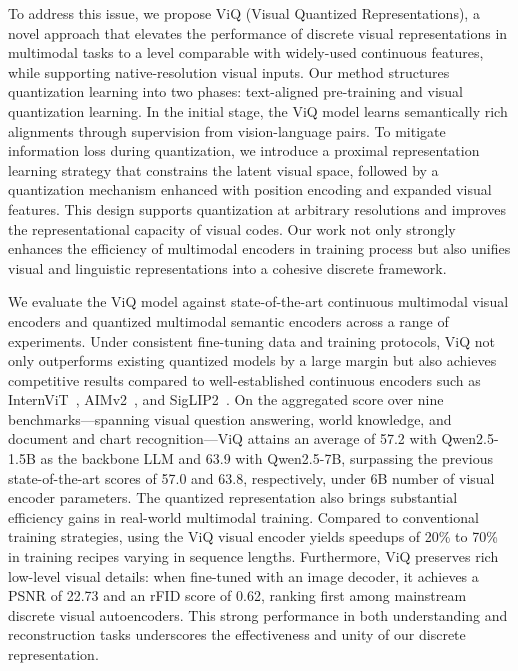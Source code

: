 To address this issue, we propose ViQ (Visual Quantized Representations), a novel approach that elevates the performance of discrete visual representations in multimodal tasks to a level comparable with widely-used continuous features, while supporting native-resolution visual inputs. Our method structures quantization learning into two phases: text-aligned pre-training and visual quantization learning. In the initial stage, the ViQ model learns semantically rich alignments through supervision from vision-language pairs. To mitigate information loss during quantization, we introduce a proximal representation learning strategy that constrains the latent visual space, followed by a quantization mechanism enhanced with position encoding and expanded visual features. This design supports quantization at arbitrary resolutions and improves the representational capacity of visual codes. Our work not only strongly enhances the efficiency of multimodal encoders in training process but also unifies visual and linguistic representations into a cohesive discrete framework.

We evaluate the ViQ model against state-of-the-art continuous multimodal visual encoders and quantized multimodal semantic encoders across a range of experiments. Under consistent fine-tuning data and training protocols, ViQ not only outperforms existing quantized models by a large margin but also achieves competitive results compared to well-established continuous encoders such as InternViT~\cite{zhu2025internvl3}, AIMv2~\cite{fini2025multimodal}, and SigLIP2~\cite{tschannen2025siglip}. On the aggregated score over nine benchmarks—spanning visual question answering, world knowledge, and document and chart recognition—ViQ attains an average of 57.2 with Qwen2.5-1.5B as the backbone LLM and 63.9 with Qwen2.5-7B, surpassing the previous state-of-the-art scores of 57.0 and 63.8, respectively, under 6B number of visual encoder parameters. The quantized representation also brings substantial efficiency gains in real-world multimodal training. Compared to conventional training strategies, using the ViQ visual encoder yields speedups of 20\% to 70\% in training recipes varying in sequence lengths. Furthermore, ViQ preserves rich low-level visual details: when fine-tuned with an image decoder, it achieves a PSNR of 22.73 and an rFID score of 0.62, ranking first among mainstream discrete visual autoencoders. This strong performance in both understanding and reconstruction tasks underscores the effectiveness and unity of our discrete representation.
